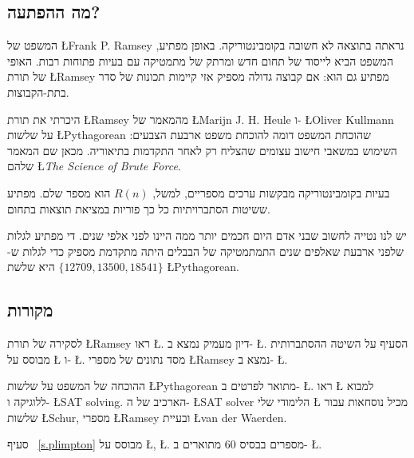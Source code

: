 
\subsection*{מה ההפתעה?}

המשפט של
\L{Frank P. Ramsey}
נראתה בתוצאה לא חשובה בקומבינטוריקה. באופן מפתיע, המשפט הביא לייסוד של תחום חדש ומרתק של מתמטיקה עם בעיות פתוחות רבות. האופי של תורת
\L{Ramsey}
מפתיע גם הוא: אם קבוצה גדולה מספיק אזי קיימות תכונות של סדר בתת-הקבוצות.

היכרתי את תורת 
\L{Ramsey}
מהמאמר של
\L{Marijn J. H. Heule}
ו-%
\L{Oliver Kullmann}
על שלשות
\L{Pythagorean}
שהוכחת המשפט דומה להוכחת משפט ארבעת הצבעים: השימוש במשאבי חישוב עצומים שהצליח רק לאחר התקדמות בתיאוריה. מכאן שם המאמר שלהם
\L{\textit{The Science of Brute Force}}.

בעיות בקומבינטוריקה מבקשות ערכים מספריים, למשל, 
$R(n)$
הוא מספר שלם. מפתיע ששיטות הסתברויתיות כל כך פוריות במציאת תוצאות בתחום.

יש לנו נטייה לחשוב שבני אדם היום חכמים יותר ממה היינו לפני אלפי שנים. די מפתיע לגלות שלפני ארבעת שאלפים שנים התמתמטיקה של הבבלים היתה מתקדמת מספיק כדי לגלות ש-%
$\{12709, 13500, 18541\}$
היא שלשת
\L{Pythagorean}.

\subsection*{מקורות}

לסקירה של תורת
\L{Ramsey}
ראו
\L{\cite{burton}}.
דיון מעמיק נמצא ב-%
\L{\cite{rudiments}}.
הסעיף על השיטה ההסתברותית מבוסס על
\L{\cite[Example~4o]{ross}}
ו-%
\L{\cite[Chapter~4]{burton}}.
מסד נתונים של מספרי
\L{Ramsey}
נמצא ב-%
\L{\cite{mckay}}.

ההוכחה של המשפט על שלשות
\L{Pythagorean}
מתואר לפרטים ב-%
\L{\cite{brute}}.
ראו 
\L{\cite{mlcs}}
למבוא ללוגיקה ו-%
\L{SAT solving}.
הארכיב של ה-%
\L{SAT solver}
הלימודי שלי 
\L{\cite{joss}}
מכיל נוסחאות עבור שלשות
\L{Schur}, 
מספרי
\L{Ramsey}
ובעיית
\L{van der Waerden}.

סעיף%
~\ref{s.plimpton}
מבוסס על
\L{\cite{wiki:plimpton}}, \L{\cite{robson}}. 
מספרים בבסיס
$60$
מתוארים ב-%
\L{\cite{wiki:sexagesimal}}.
